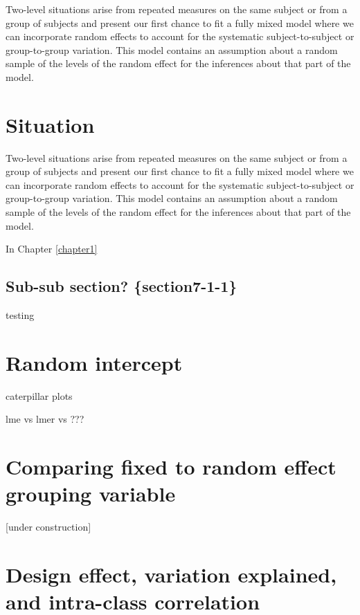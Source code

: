 \documentclass[
]{book}
\begin{document}
Two-level situations arise from repeated measures on the same subject or from a group of subjects and present our first chance to fit a fully mixed model where we can incorporate random effects to account for the systematic subject-to-subject or group-to-group variation. This model contains an assumption about a random sample of the levels of the random effect for the inferences about that part of the model.

\hypertarget{section7-1}{%
\section{Situation}\label{section7-1}}

\indent Two-level situations arise from repeated measures on the same subject or from a group of subjects and present our first chance to fit a fully mixed model where we can incorporate random effects to account for the systematic subject-to-subject or group-to-group variation. This model contains an assumption about a random sample of the levels of the random effect for the inferences about that part of the model.

In Chapter \ref{chapter1}

\hypertarget{sub-sub-section-section7-1-1}{%
\subsection{Sub-sub section? \{section7-1-1\}}\label{sub-sub-section-section7-1-1}}

testing

\hypertarget{section7-2}{%
\section{Random intercept}\label{section7-2}}

caterpillar plots

lme vs lmer vs ???

\hypertarget{section7-3}{%
\section{Comparing fixed to random effect grouping variable}\label{section7-3}}

{[}under construction{]}

\hypertarget{section7-4}{%
\section{Design effect, variation explained, and intra-class correlation}\label{section7-4}}
\end{document}
